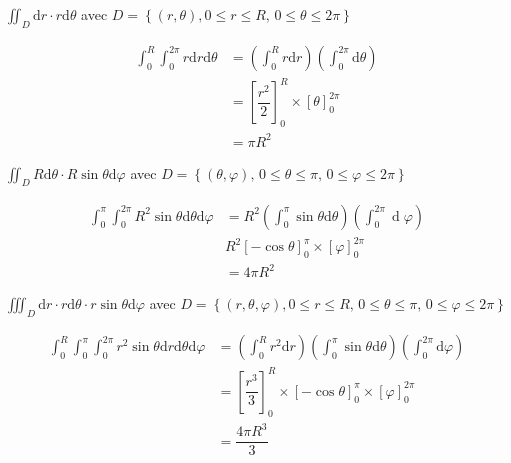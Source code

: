 \begin{enonce}
$\iint_{D}\mathrm{d}r\cdot r\mathrm{d}\theta$ avec $D=\left\{ \left(r,\theta\right),0\leq r\leq R,\,0\leq\theta\leq2\pi\right\} $
\end{enonce}
%
\begin{corrige}
\begin{align*}
\int_{0}^{R}\int_{0}^{2\pi}r\mathrm{d}r\mathrm{d}\theta & =\left(\int_{0}^{R}r\mathrm{d}r\right)\left(\int_{0}^{2\pi}\mathrm{d}\theta\right)\\
 & =\left[\dfrac{r^{2}}{2}\right]_{0}^{R}\times\left[\theta\right]_{0}^{2\pi}\\
 & =\pi R^{2}
\end{align*}
\end{corrige}
\begin{enonce}
$\iint_{D}R\mathrm{d}\theta\cdot R\sin\theta\mathrm{d}\varphi$
avec $D=\left\{ \left(\theta,\varphi\right),\,0\leq\theta\leq\pi,\,0\leq\varphi\leq2\pi\right\} $
\end{enonce}
%
\begin{corrige}
\begin{align*}
\int_{0}^{\pi}\int_{0}^{2\pi}R^{2}\sin\theta\mathrm{d}\theta\mathrm{d}\varphi & =R^{2}\left(\int_{0}^{\pi}\sin\theta\mathrm{d}\theta\right)\left(\int_{0}^{2\pi}\mathrel{d}\varphi\right)\\
 & R^{2}\left[-\cos\theta\right]_{0}^{\pi}\times\left[\varphi\right]_{0}^{2\pi}\\
 & =4\pi R^{2}
\end{align*}
\end{corrige}
\begin{enonce}
$\iiint_{D}\mathrm{d}r\cdot r\mathrm{d}\theta\cdot r\sin\theta\mathrm{d}\varphi$
avec $D=\left\{ \left(r,\theta,\varphi\right),0\leq r\leq R,\,0\leq\theta\leq\pi,\,0\leq\varphi\leq2\pi\right\} $
\end{enonce}
%
\begin{corrige}
\begin{align*}
\int_{0}^{R}\int_{0}^{\pi}\int_{0}^{2\pi}r^{2}\sin\theta\mathrm{d}r\mathrm{d}\theta\mathrm{d}\varphi & =\left(\int_{0}^{R}r^{2}\mathrm{d}r\right)\left(\int_{0}^{\pi}\sin\theta\mathrm{d}\theta\right)\left(\int_{0}^{2\pi}\mathrm{d}\varphi\right)\\
 & =\left[\dfrac{r^{3}}{3}\right]_{0}^{R}\times\left[-\cos\theta\right]_{0}^{\pi}\times\left[\varphi\right]_{0}^{2\pi}\\
 & =\dfrac{4\pi R^{3}}{3}
\end{align*}
\end{corrige}


